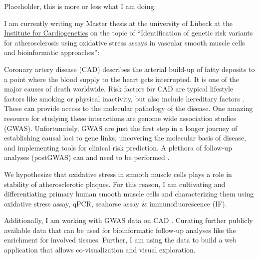 Placeholder, this is more or less what I am doing:

I am currently writing my Master thesis at the university of Lübeck at the \href{https://www.cardiogenetics-luebeck.de/}{\color{myblue}Institute for Cardiogenetics} on the topic of “Identification of genetic risk variants for atherosclerosis using oxidative stress assays in vascular smooth muscle cells and bioinformatic approaches”:

Coronary artery disease (CAD) describes the arterial build-up of fatty deposits to a point where the blood supply to the heart gets interrupted. It is one of the major causes of death worldwide. Risk factors for CAD are typical lifestyle factors like smoking or physical inactivity, but also include hereditary factors \cite{cdcCoronaryArteryDisease2021, CoronaryHeartDisease2018}. These can provide access to the molecular pathology of the disease. One amazing resource for studying these interactions are genome wide association studies (GWAS). Unfortunately, GWAS are just the first step in a longer journey of establishing causal loci to gene links, uncovering the molecular basis of disease, and implementing tools for clinical risk prediction. A plethora of follow-up analyses (postGWAS) can and need to be performed \cite{lichouFunctionalStudiesGWAS2020a}.

We hypothesize that oxidative stress in smooth muscle cells plays a role in stability of atherosclerotic plaques. For this reason, I am cultivating and differentiating primary human smooth muscle cells and characterizing them using oxidative stress assay, qPCR, seahorse assay \& immunofluorescence (IF).

Additionally, I am working with GWAS data on CAD \cite{aragamDiscoverySystematicCharacterization2021a}. Curating further publicly available data that can be used for bioinformatic follow-up analyses like the enrichment for involved tissues. Further, I am using the data to build a web application that allows co-visualization and visual exploration.
